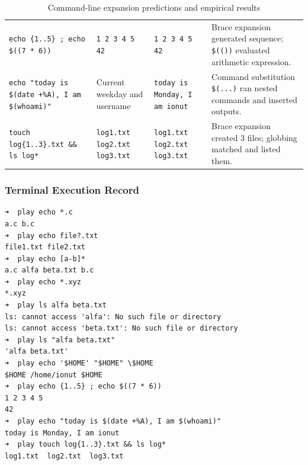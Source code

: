 \documentclass{labreport}
\begin{document}
\begin{table}[H]
\begin{tabularx}{\textwidth}{p{4.2cm} p{3.2cm} p{3.5cm} X}
\addlinespace
\texttt{echo \{1..5\} ; echo \$((7 * 6))} & \texttt{1 2 3 4 5} \newline \texttt{42} & \texttt{1 2 3 4 5} \newline \texttt{42} & Brace expansion generated sequence; \texttt{\$(())} evaluated arithmetic expression. \\
\addlinespace
\texttt{echo "today is \$(date +\%A), I am \$(whoami)"} & Current weekday and username & \texttt{today is Monday, I am ionut} & Command substitution \texttt{\$(...)} ran nested commands and inserted outputs. \\
\addlinespace
\texttt{touch log\{1..3\}.txt \&\& ls log*} & \texttt{log1.txt log2.txt log3.txt} & \texttt{log1.txt log2.txt log3.txt} & Brace expansion created 3 files; globbing matched and listed them. \\
\bottomrule
\end{tabularx}
\caption{Command-line expansion predictions and empirical results}
\end{table}

\subsubsection{Terminal Execution Record}
\begin{lstlisting}[style=bash]
➜  play echo *.c
a.c b.c
➜  play echo file?.txt
file1.txt file2.txt
➜  play echo [a-b]*
a.c alfa beta.txt b.c
➜  play echo *.xyz
*.xyz
➜  play ls alfa beta.txt
ls: cannot access 'alfa': No such file or directory
ls: cannot access 'beta.txt': No such file or directory
➜  play ls "alfa beta.txt"
'alfa beta.txt'
➜  play echo '$HOME' "$HOME" \$HOME
$HOME /home/ionut $HOME
➜  play echo {1..5} ; echo $((7 * 6))
1 2 3 4 5
42
➜  play echo "today is $(date +%A), I am $(whoami)"
today is Monday, I am ionut
➜  play touch log{1..3}.txt && ls log*
log1.txt  log2.txt  log3.txt
\end{lstlisting}
\end{document}
